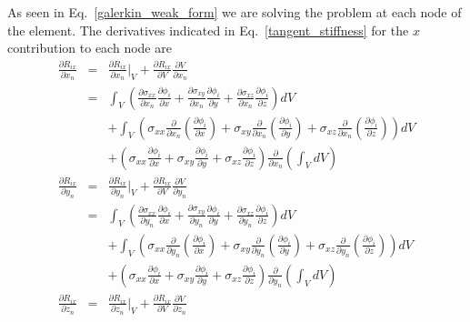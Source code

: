 As seen in Eq.\ \eqref{galerkin_weak_form} we are solving the problem at each node of the element. The derivatives indicated in Eq.\ \eqref{tangent_stiffness} for the $x$ contribution to each node are
%
\begin{eqnarray}
\frac{\partial R_{ix}}{\partial x_n} &=& \frac{\partial R_{ix}}{\partial x_n} \bigg |_V + \frac{\partial R_{ix}}{\partial V} \frac{\partial V}{\partial x_n} \nonumber\\
&=& \int_V \left(\frac{\partial \sigma_{xx}}{\partial x_n}\frac{\partial \phi_i}{\partial x} + \frac{\partial \sigma_{xy}}{\partial x_n}\frac{\partial \phi_i}{\partial y} + \frac{\partial \sigma_{xz}}{\partial x_n}\frac{\partial \phi_i}{\partial z}  \right) dV \nonumber\\
&&+ \int_V \left( \sigma_{xx} \frac{\partial}{\partial x_n} \left(\frac{\partial \phi_i}{\partial x}\right)+\sigma_{xy} \frac{\partial}{\partial x_n} \left(\frac{\partial \phi_i}{\partial y}\right) + \sigma_{xz} \frac{\partial}{\partial x_n} \left(\frac{\partial \phi_i}{\partial z}\right) \right) dV \nonumber\\
&& + \left(  \sigma_{xx} \frac{\partial \phi_i}{\partial x} + \sigma_{xy} \frac{\partial \phi_i}{\partial y} + \sigma_{xz} \frac{\partial \phi_i}{\partial z} \right) \frac{\partial}{\partial x_n} \left(\int_V dV \right) \nonumber\\
\frac{\partial R_{ix}}{\partial y_n} &=& \frac{\partial R_{ix}}{\partial y_n} \bigg |_V + \frac{\partial R_{ix}}{\partial V} \frac{\partial V}{\partial y_n} \nonumber\\
&=& \int_V \left(\frac{\partial \sigma_{xx}}{\partial y_n}\frac{\partial \phi_i}{\partial x} +\frac{\partial \sigma_{xy}}{\partial y_n}\frac{\partial \phi_i}{\partial y} +  \frac{\partial \sigma_{xz}}{\partial y_n}\frac{\partial \phi_i}{\partial z}  \right) dV \nonumber\\
&& + \int_V \left( \sigma_{xx} \frac{\partial}{\partial y_n} \left(\frac{\partial \phi_i}{\partial x}\right)+ \sigma_{xy} \frac{\partial}{\partial y_n} \left(\frac{\partial \phi_i}{\partial y}\right) + \sigma_{xz} \frac{\partial}{\partial y_n} \left(\frac{\partial \phi_i}{\partial z}\right) \right) dV \nonumber\\
&& + \left(  \sigma_{xx} \frac{\partial \phi_i}{\partial x} + \sigma_{xy} \frac{\partial \phi_i}{\partial y} + \sigma_{xz} \frac{\partial \phi_i}{\partial z} \right) \frac{\partial}{\partial y_n} \left(\int_V dV \right) \nonumber\\
\frac{\partial R_{ix}}{\partial z_n} &=& \frac{\partial R_{ix}}{\partial z_n} \bigg |_V + \frac{\partial R_{ix}}{\partial V} \frac{\partial V}{\partial z_n} \nonumber\\

\end{eqnarray}
